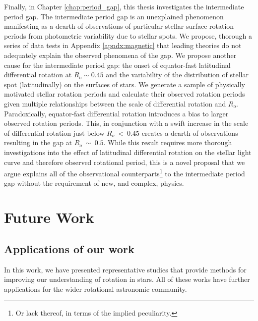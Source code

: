 Finally, in Chapter \ref{chap:period_gap}, this thesis investigates the intermediate period gap.
The intermediate period gap is an unexplained phenomenon manifesting as a dearth of observations of particular stellar surface rotation periods from photometric variability due to stellar spots.
We propose, thorough a series of data tests in Appendix \ref{apndx:magnetic} that leading theories do not adequately explain the observed phenomena of the gap. 
We propose another cause for the intermediate period gap: the onset of equator-fast latitudinal differential rotation at $R_o \sim 0.45$ and the variability of the distribution of stellar spot (latitudinally) on the surfaces of stars.
We generate a sample of physically motivated stellar rotation periods and calculate their observed rotation periods given multiple relationships between the scale of differential rotation and $R_o$.
Paradoxically, equator-fast differential rotation introduces a bias to larger observed rotation periods.
This, in conjunction with a swift increase in the scale of differential rotation just below $R_o \ < \ 0.45$ creates a dearth of observations resulting in the gap at $R_o \ \sim \ 0.5$.
While this result requires more thorough investigations into the effect of latitudinal differential rotation on the stellar light curve and therefore observed rotational period, this is a novel proposal that we argue explains all of the observational counterparts\footnote{Or lack thereof, in terms of the implied peculiarity.} to the intermediate period gap without the requirement of new, and complex, physics.

\section{Future Work}

\subsection{Applications of our work}

In this work, we have presented representative studies that provide methods for improving our understanding of rotation in stars.
All of these works have further applications for the wider rotational astronomic community.

